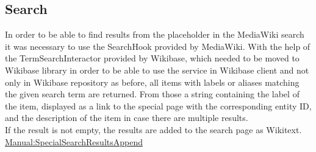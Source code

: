 \subsection{Search}
In order to be able to find results from the placeholder in the MediaWiki search it was necessary to use the SearchHook provided by MediaWiki.
With the help of the TermSearchInteractor provided by Wikibase, which needed to be moved to Wikibase library in order to be able to use the service in Wikibase client and not only in Wikibase repository as before, all items with labels or aliases matching the given search term are returned. From those a string containing the label of the item, displayed as a link to the special page with the corresponding entity ID, and the description of the item in case there are multiple results.  \\
If the result is not empty, the results are added to the search page as Wikitext. \\
\href{https://www.mediawiki.org/wiki/Manual:Hooks/SpecialSearchResultsAppend}{Manual:SpecialSearchResultsAppend}